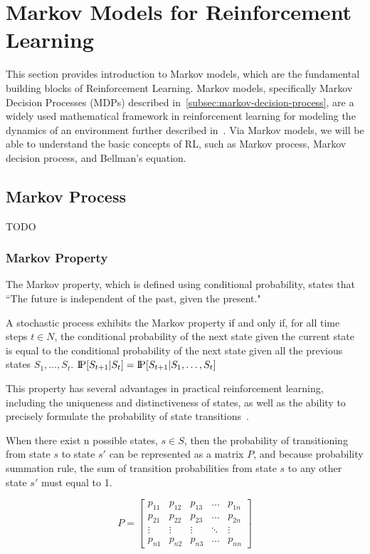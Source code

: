 \documentclass[../xlapes02]{subfiles}
\begin{document}
    \section{Markov Models for Reinforcement Learning}\label{sec:markov-models-for-rl}
    This section provides introduction to Markov models, which are the fundamental building blocks of Reinforcement Learning.
    Markov models, specifically Markov Decision Processes (MDPs) described in~\cref{subsec:markov-decision-process},
    are a widely used mathematical framework in reinforcement learning for modeling the dynamics of an environment further described in~.
    Via Markov models, we will be able to understand the basic concepts of RL, such as Markov process, Markov decision process, and Bellman's equation.

    \subsection{Markov Process}\label{subsec:markov-process}
    TODO

    \subsubsection{Markov Property}\label{subsubsec:markov-property}
    The Markov property, which is defined using conditional probability, states that ``The future is independent of the past, given the present."

    A stochastic process exhibits the Markov property if and only if, for all time steps $t \in N$, the conditional probability of the next state given the current state is equal to the conditional probability of the next state given all the previous states $S_1, \ldots, S_t$.
    $\text{I\kern-0.15em P}[S_{t+1}|S_t] = \text{I\kern-0.15em P}[S_{t+1}|S_1,\ldots,S_t]$

    This property has several advantages in practical reinforcement learning, including the uniqueness and distinctiveness of states, as well as the ability to precisely formulate the probability of state transitions~\cite{FITMT25127}.

    When there exist n possible states, $s\in S$, then the probability of transitioning from state $s$ to state $s'$ can be represented as a matrix $P$, and because probability summation rule, the sum of transition probabilities from state $s$ to any other state $s'$ must equal to 1.

    \begin{equation}
        P=\begin{bmatrix}
              p_{11} & p_{12} & p_{13} & \dots  & p_{1n} \\
              p_{21} & p_{22} & p_{23} & \dots  & p_{2n} \\
              \vdots & \vdots & \vdots & \ddots & \vdots \\
              p_{n1} & p_{n2} & p_{n3} & \dots  & p_{nn}
        \end{bmatrix}
    \end{equation}
\end{document}
